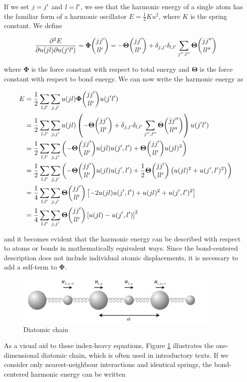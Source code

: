 \noindent If we set $j=j^\prime$ and $l=l^\prime$, we see that the harmonic energy of a single atom has the familiar form of a harmonic oscillator $E=\frac{1}{2}Ku^2$, where $K$ is the spring constant. We define

\[ \frac{\partial ^2 E}{\partial u(jl) \partial u(\jp \lp)} = \fc = \fcbf \]

\noindent where $\bm{\Phi}$ is the force constant with respect to total energy and $\bm{\Theta}$ is the force constant with respect to bond energy. We can now write the harmonic energy as

\begin{align*}
	E &= \frac{1}{2} \sum_{l,\lp} \sum_{j,\jp} u(jl) \fc u(\jp \lp) \\
	  &= \frac{1}{2} \sum_{l,\lp} \sum_{j,\jp} u(jl) \left( \fcbf \right) u(\jp \lp) \\
	  &= \frac{1}{2} \sum_{l,\lp} \sum_{j,\jp} \left( - \fcb u(jl)u(\jp,\lp) + \fcb u(jl)^2 \right) \\
	  &= \frac{1}{2} \sum_{l,\lp} \sum_{j,\jp} \left( - \fcb u(jl)u(\jp,\lp) +\frac{1}{2} \fcb \left( u(jl)^2 + u(\jp, \lp)^2 \right) \right) \\
  	  &= \frac{1}{4} \sum_{l,\lp} \sum_{j,\jp} \fcb \left[ -2u(jl)u(\jp,\lp) + u(jl)^2 + u(\jp,\lp)^2 \right] \\
  	  &= \frac{1}{4} \sum_{l,\lp} \sum_{j,\jp} \fcb \left[ u(jl) - u(\jp,\lp) \right]^2
\end{align*}

\noindent and it becomes evident that the harmonic energy can be described with respect to atoms or bonds in mathematically equivalent ways. Since the bond-centered description does not include individual atomic displacements, it is necessary to add a self-term to $\bm{\Phi}$. 

\begin{figure}
	\centering
	\includegraphics[width=0.9\textwidth]{fig/temp/diatomic.png}
	\caption{Diatomic chain}
	\label{fig:diatomic}
\end{figure}

As a visual aid to these index-heavy equations, Figure \ref{fig:diatomic} illustrates the one-dimensional diatomic chain, which is often used in introductory texts. If we consider only nearest-neighbour interactions and identical springs, the bond-centered harmonic energy can be written

